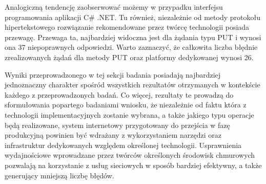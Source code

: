 Analogiczną tendencję zaobserwować możemy w przypadku interfejsu programowania aplikacji C\# .NET. Tu również, niezależnie od metody protokołu hipertekstowego rozwiązanie rekomendowane przez twórcę technologii posiada przewagę. Przewaga ta, najbardziej widoczna jest dla żądania typu PUT i wynosi ona 37 niepoprawnych odpowiedzi. Warto zaznaczyć, że całkowita liczba błędnie zrealizowanych żądań dla metody PUT oraz platformy dedykowanej wynosi 26.

Wyniki przeprowadzonego w tej sekcji badania posiadają najbardziej jednoznaczny charakter spośród wszystkich rezultatów otrzymanych w kontekście każdego z przeprowadzonych badań. Co więcej, rezultaty te prowadzą do sformułowania popartego badaniami wniosku, że niezależnie od faktu która z technologii implementacyjnych zostanie wybrana, a także jakiego typu operacje będą realizowane, system internetowy przygotowany do przejścia w fazę produkcyjną powinien być wdrażany z wykorzystaniem narzędzi oraz infrastruktur dedykowanych względem określonej technologii. Usprawnienia wydajnościowe wprowadzane przez twórców określonych środowisk chmurowych pozwalają na korzystanie z usług sieciowych w sposób bardziej efektywny, a także generujący mniejszą liczbę błędów.